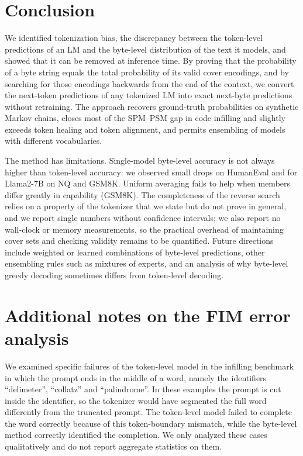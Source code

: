 \documentclass{article} %
\begin{document}
\section{Conclusion}
\label{sec:conclusion}
We identified tokenization bias, the discrepancy between the token-level predictions of an LM and the byte-level distribution of the text it models, and showed that it can be removed at inference time. By proving that the probability of a byte string equals the total probability of its valid cover encodings, and by searching for those encodings backwards from the end of the context, we convert the next-token predictions of any tokenized LM into exact next-byte predictions without retraining. The approach recovers ground-truth probabilities on synthetic Markov chains, closes most of the SPM--PSM gap in code infilling and slightly exceeds token healing and token alignment, and permits ensembling of models with different vocabularies.

The method has limitations. Single-model byte-level accuracy is not always higher than token-level accuracy: we observed small drops on HumanEval and for Llama2-7B on NQ and GSM8K. Uniform averaging fails to help when members differ greatly in capability (GSM8K). The completeness of the reverse search relies on a property of the tokenizer that we state but do not prove in general, and we report single numbers without confidence intervals; we also report no wall-clock or memory measurements, so the practical overhead of maintaining cover sets and checking validity remains to be quantified. Future directions include weighted or learned combinations of byte-level predictions, other ensembling rules such as mixtures of experts, and an analysis of why byte-level greedy decoding sometimes differs from token-level decoding.




\appendix
\section{Additional notes on the FIM error analysis}
\label{app:cases}
We examined specific failures of the token-level model in the infilling benchmark in which the prompt ends in the middle of a word, namely the identifiers ``delimeter'', ``collatz'' and ``palindrome''. In these examples the prompt is cut inside the identifier, so the tokenizer would have segmented the full word differently from the truncated prompt. The token-level model failed to complete the word correctly because of this token-boundary mismatch, while the byte-level method correctly identified the completion. We only analyzed these cases qualitatively and do not report aggregate statistics on them.
\end{document}

